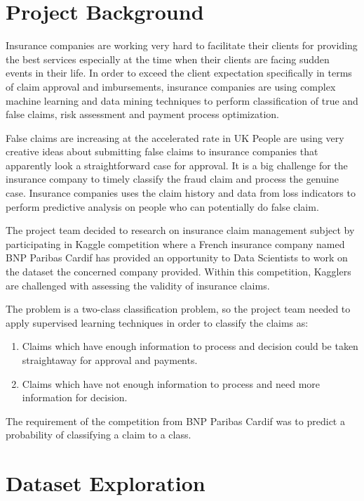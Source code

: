 \documentclass[conference, onecolumn]{IEEEtran}
\begin{document}

\section{Project Background}
Insurance companies are working very hard to facilitate their clients for providing the best services especially at the time when their clients are facing sudden events in their life. 
In order to exceed the client expectation specifically in terms of claim approval and imbursements, insurance companies are using complex machine learning and data mining techniques to perform classification of true and false claims, risk assessment and payment process optimization.

False claims are increasing at the accelerated rate in UK\cite{pb1} People are using very creative ideas about submitting false claims to insurance companies that apparently look a straightforward case for approval.  
It is a big challenge for the insurance company to timely classify the fraud claim and process the genuine case. Insurance companies uses the claim history and data from loss indicators to perform predictive analysis on people who can potentially do false claim.

The project team decided to research on insurance claim management subject by participating in Kaggle competition where a French insurance company named BNP Paribas Cardif has provided an opportunity to Data Scientists to work on the dataset the concerned company provided. Within this competition, Kagglers are challenged with assessing the validity of insurance claims.

The problem is a two-class classification problem, so the project team needed to apply supervised learning techniques in order to classify the claims as:
%
\begin{enumerate}
\item Claims which have enough information to process and decision could be taken straightaway for approval and payments.
\item Claims which have not enough information to process and need more information for decision.
\end{enumerate} 

The requirement of the competition from BNP Paribas Cardif was to predict a probability of classifying a claim to a class.


\section{Dataset Exploration}
\end{document}
